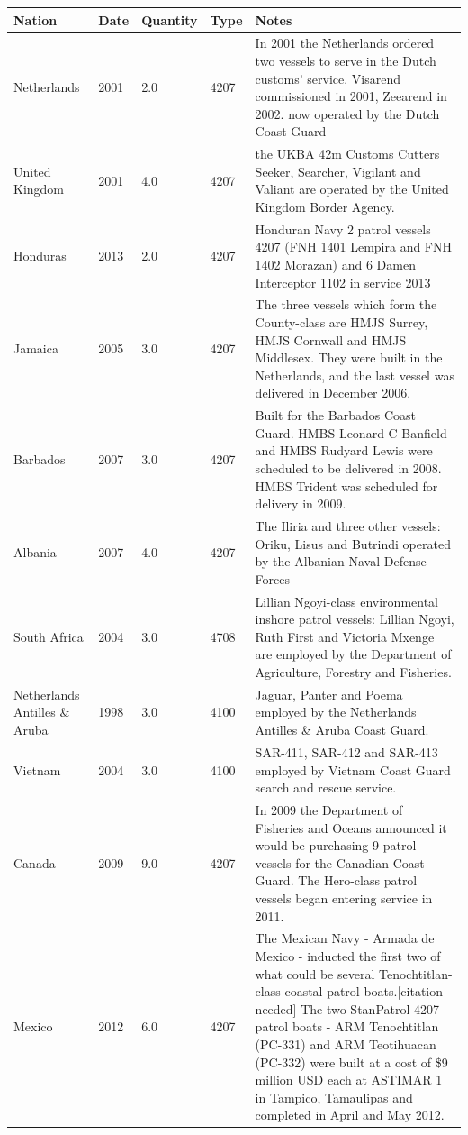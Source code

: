 \documentclass{article}
\begin{document}
\begin{tabular}{lllll}
\toprule
Nation & Date & Quantity & Type & Notes \\
\midrule
Netherlands & 2001 & 2.0 & 4207 & In 2001 the Netherlands ordered two vessels to serve in the Dutch customs' service. Visarend commissioned in 2001, Zeearend in 2002. now operated by the Dutch Coast Guard \\
United Kingdom & 2001 & 4.0 & 4207 & the UKBA 42m Customs Cutters Seeker, Searcher, Vigilant and Valiant are operated by the United Kingdom Border Agency. \\
Honduras & 2013 & 2.0 & 4207 & Honduran Navy 2 patrol vessels 4207 (FNH 1401 Lempira and FNH 1402 Morazan) and 6 Damen Interceptor 1102 in service 2013 \\
Jamaica & 2005 & 3.0 & 4207 & The three vessels which form the County-class are HMJS Surrey, HMJS Cornwall and HMJS Middlesex. They were built in the Netherlands, and the last vessel was delivered in December 2006. \\
Barbados & 2007 & 3.0 & 4207 & Built for the Barbados Coast Guard. HMBS Leonard C Banfield and HMBS Rudyard Lewis were scheduled to be delivered in 2008. HMBS Trident was scheduled for delivery in 2009. \\
Albania & 2007 & 4.0 & 4207 & The Iliria and three other vessels: Oriku, Lisus and Butrindi operated by the Albanian Naval Defense Forces \\
South Africa & 2004 & 3.0 & 4708 & Lillian Ngoyi-class environmental inshore patrol vessels: Lillian Ngoyi, Ruth First and Victoria Mxenge are employed by the Department of Agriculture, Forestry and Fisheries. \\
Netherlands Antilles \& Aruba & 1998 & 3.0 & 4100 & Jaguar, Panter and Poema employed by the Netherlands Antilles \& Aruba Coast Guard. \\
Vietnam & 2004 & 3.0 & 4100 & SAR-411, SAR-412 and SAR-413 employed by Vietnam Coast Guard search and rescue service. \\
Canada & 2009 & 9.0 & 4207 & In 2009 the Department of Fisheries and Oceans announced it would be purchasing 9 patrol vessels for the Canadian Coast Guard. The Hero-class patrol vessels began entering service in 2011. \\
Mexico & 2012 & 6.0 & 4207 & The Mexican Navy - Armada de Mexico - inducted the first two of what could be several Tenochtitlan-class coastal patrol boats.[citation needed] The two StanPatrol 4207 patrol boats - ARM Tenochtitlan (PC-331) and ARM Teotihuacan (PC-332) were built at a cost of \$9 million USD each at ASTIMAR 1 in Tampico, Tamaulipas and completed in April and May 2012. \\

\end{tabular}
\end{document}
